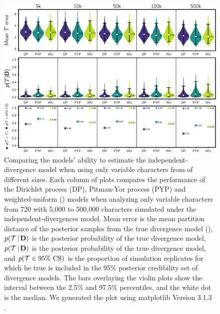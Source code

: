 \begin{figure}[htbp]
    \begin{center}
        \includegraphics[width=\textwidth,height=\textheight,keepaspectratio]{../images/from-project-repo/var-only-nchars-model-performance-violin-cropped.pdf}
        \captionsetup{name=Figure S, labelformat=noSpace, listformat=sFigList}
        \caption{
        Comparing the models' ability to estimate the independent-divergence
        model when using only variable characters from \datasets of different
        sizes.
        Each column of plots compares the performance of the Dirichlet process
        (DP), Pitman-Yor process (PYP) and weighted-uniform (\wunif) models when
        analyzing only variable characters from 720 \datasets with 5,000 to
        500,000 characters simulated under the independent-divergences model.
        Mean \etimesets error is the mean partition distance
        of the posterior samples from the true
        divergence model (\etimesets),
        $p(\mathcal{T} \,|\, \mathbf{D})$ is the posterior probability
        of the true divergence model,
        $p(\mathcal{T} \,|\, \mathbf{D})$ is the posterior probability of the
        true divergence model,
        and
        $p(\mathcal{T} \in \textrm{95\% CS})$ is the proportion of simulation
        replicates for which he true \etimesets is included in the 95\%
        posterior credibility set of divergence models.
        The bars overlaying the violin plots show the interval between the
        2.5\% and 97.5\% percentiles, and the white dot is the median.
        We generated the plot using matplotlib Version 3.1.3
        \citep{matplotlib}.
        }
        \label{fig:varonlymodelperformancebysize}
    \end{center}
\end{figure}

